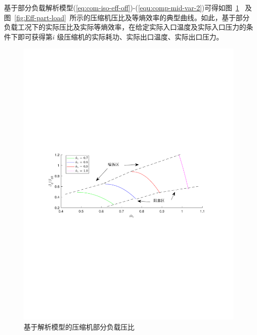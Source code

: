 基于部分负载解析模型(\ref{eq:com-iso-eff-off})-(\ref{equ:comp-mid-var-2})可得如图~\ref{fig:Comp-Ratio-off-design}~ 及图~\ref{fig:Eff-part-load}~所示的压缩机压比及等熵效率的典型曲线\cite{CAES-Wind-Rui-19}。如此，基于部分负载工况下的实际压比及实际等熵效率，在给定实际入口温度及实际入口压力的条件下即可获得第$i$ 级压缩机的实际耗功、实际出口温度、实际出口压力。

\begin{figure}[H] %
  \centering
  \includegraphics[scale=0.70]{figures/Chap2-2-Comp-Ratio-off-design.pdf}
  \caption{基于解析模型的压缩机部分负载压比}
  \label{fig:Comp-Ratio-off-design}
\end{figure}


